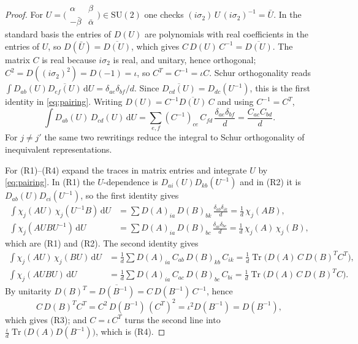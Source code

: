 \documentclass[11pt,a4paper]{amsart}
\theoremstyle{definition}
\theoremstyle{remark}
\numberwithin{equation}{section}
\DeclareMathOperator{\Tr}{Tr}        %
\newcommand{\dd}{\,\mathrm{d}}             %
\newcommand{\SU}{\mathrm{SU}}              %
\begin{document}
\begin{proof}
For $U=\bigl(\begin{smallmatrix}\alpha&\beta\\-\bar\beta&\bar\alpha\end{smallmatrix}\bigr)\in\SU(2)$ one checks $(i\sigma_2)\,U\,(i\sigma_2)^{-1}=\bar U$. In the standard basis the entries of $D(U)$ are polynomials with real coefficients in the entries of $U$, so $D(\bar U)=\overline{D(U)}$, which gives $C\,D(U)\,C^{-1}=\overline{D(U)}$. The matrix $C$ is real because $i\sigma_2$ is real, and unitary, hence orthogonal; $C^2=D((i\sigma_2)^2)=D(-1)=\iota$, so $C^T=C^{-1}=\iota C$. Schur orthogonality reads $\int D_{ab}(U)\overline{D_{ef}(U)}\dd U=\delta_{ae}\delta_{bf}/d$. Since $\overline{D_{cd}(U)}=D_{dc}(U^{-1})$, this is the first identity in \eqref{eq:pairing}. Writing $D(U)=C^{-1}\overline{D(U)}\,C$ and using $C^{-1}=C^T$,
\[
\int D_{ab}(U)\,D_{cd}(U)\dd U=\sum_{e,f}(C^{-1})_{ce}\,C_{fd}\,\frac{\delta_{ae}\delta_{bf}}{d}=\frac{C_{ac}C_{bd}}{d}.
\]
For $j\ne j'$ the same two rewritings reduce the integral to Schur orthogonality of inequivalent representations.

For (R1)--(R4) expand the traces in matrix entries and integrate $U$ by \eqref{eq:pairing}. In (R1) the $U$-dependence is $D_{ai}(U)D_{kb}(U^{-1})$ and in (R2) it is $D_{ab}(U)D_{ci}(U^{-1})$, so the first identity gives
\begin{align*}
\int\chi_j(AU)\,\chi_j(U^{-1}B)\dd U&=\sum D(A)_{ia}\,D(B)_{bk}\,\frac{\delta_{ab}\delta_{ik}}{d}=\frac1d\,\chi_j(AB),\\
\int\chi_j(AUBU^{-1})\dd U&=\sum D(A)_{ia}\,D(B)_{bc}\,\frac{\delta_{ai}\delta_{bc}}{d}=\frac1d\,\chi_j(A)\,\chi_j(B),
\end{align*}
which are (R1) and (R2). The second identity gives
\begin{align*}
\int\chi_j(AU)\,\chi_j(BU)\dd U&=\frac1d\sum D(A)_{ia}\,C_{ab}\,D(B)_{kb}\,C_{ik}=\frac1d\Tr\bigl(D(A)\,C\,D(B)^TC^T\bigr),\\
\int\chi_j(AUBU)\dd U&=\frac1d\sum D(A)_{ia}\,C_{ac}\,D(B)_{bc}\,C_{bi}=\frac1d\Tr\bigl(D(A)\,C\,D(B)^TC\bigr).
\end{align*}
By unitarity $D(B)^T=\overline{D(B^{-1})}=C\,D(B^{-1})\,C^{-1}$, hence
\[
C\,D(B)^TC^T=C^2\,D(B^{-1})\,(C^T)^2=\iota^2D(B^{-1})=D(B^{-1}),
\]
which gives (R3); and $C=\iota\,C^T$ turns the second line into $\frac{\iota}{d}\Tr\bigl(D(A)D(B^{-1})\bigr)$, which is (R4).
\end{proof}
\end{document}
